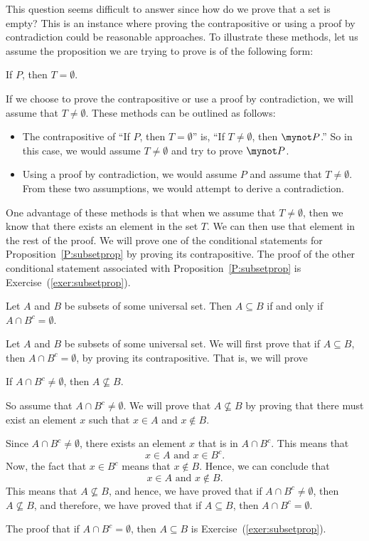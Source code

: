 This question seems difficult to answer since how do we prove that a set is empty?   This is an instance where proving the contrapositive or using a proof by contradiction could be reasonable approaches.  To illustrate these methods, let us assume the proposition we are trying to prove is of the following form:
\begin{center}
If  $P$, then  $T = \emptyset $.
\end{center}
If we choose to prove the contrapositive or use a proof  by contradiction, we will assume that  
$T \ne \emptyset $.  These methods can be outlined as follows:
\begin{itemize}
\item The contrapositive of ``If  $P$, then  $T = \emptyset $'' is, ``If $T \ne \emptyset $, then $\mynot P$.''  So in this case, we would assume  $T \ne \emptyset $ and try to prove $\mynot P$.

\item Using a proof by contradiction, we would assume $P$ and assume that  $T \ne \emptyset$.  From these two assumptions, we would attempt to derive a contradiction.

\end{itemize}
One advantage of these methods is that when we assume that  $T \ne \emptyset $, then we know that there exists an element in the set  $T$.  We can then use that element in the rest of the proof.  We will prove one of the conditional statements for Proposition~\ref{P:subsetprop} by proving its contrapositive.  The proof of the other conditional statement associated with Proposition~\ref{P:subsetprop} is Exercise~(\ref{exer:subsetprop}).
\begin{proposition} \label{P:subsetprop}
Let $A$  and  $B$  be subsets of some universal set.    Then $A \subseteq B$ if and only if 
$A \cap B^c  = \emptyset $.
\end{proposition}
%
\begin{myproof}
Let  $A$  and  $B$  be subsets of some universal set.  We will first prove that if  $A \subseteq B$, then  $A \cap B^c  = \emptyset $, by proving its contrapositive.  That is, we will prove
\begin{center}
If   $A \cap B^c  \ne \emptyset $, then  $A \not \subseteq B$.
\end{center}
So assume that  $A \cap B^c  \ne \emptyset $.  We will prove that  $A \not \subseteq B$ by proving that there must exist an element  $x$  such that  $x \in A$  and  $x \notin B$.

Since  $A \cap B^c  \ne \emptyset $, there exists an element  $x$  that is in  $A \cap B^c $.  This means that
\[
x \in A\text{  and  }x \in B^c. 
\]
Now, the fact that  $x \in B^c $ means that  $x \notin B$.  Hence, we can conclude that
\[
x \in A\text{  and  }x \notin B.
\]
This means that  $A \not \subseteq B$, and hence, we have proved that if $A \cap B^c  \ne \emptyset $, then  
$A \not \subseteq B$, and therefore, we have proved that if $A \subseteq B$, then  $A \cap B^c  = \emptyset$.

The proof that if $A \cap B^c = \emptyset$, then $A \subseteq B$ is Exercise~(\ref{exer:subsetprop}).
\end{myproof}
\hbreak



